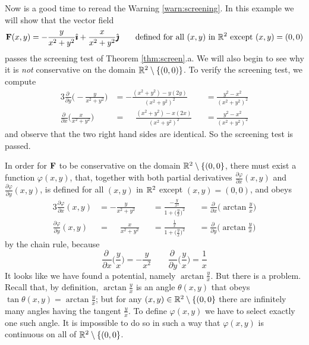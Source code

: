 \begin{eg}\label{eg:screeningCounterexample}
Now is a good time to reread the Warning \ref{warn:screening}.
In this example we will show that the vector field
\begin{equation*}
\mathbf{F}(x,y) = -\frac{y}{x^2+y^2}\hat{\pmb{\imath}} + \frac{x}{x^2+y^2}\hat{\pmb{\jmath}}
\qquad \text{defined for all $(x,y)$ in $\mathbb{R}^2$ except $(x,y)=(0,0)$}
\end{equation*}
passes the screening test of Theorem \ref{thm:screen}.a. We will also
begin to see why it is \emph{not} conservative on the domain
$\mathbb{R}^2\setminus\{(0,0)\}$. To verify the screening test, we compute
\begin{alignat*}{3}
\frac{\partial\ }{\partial y}\Big(-\frac{y}{x^2+y^2}\Big)
  &= -\frac{(x^2+y^2) - y(2y)}{{(x^2+y^2)}^2} 
  &&= \frac{y^2-x^2}{{(x^2+y^2)}^2} \\
\frac{\partial\ }{\partial x}\Big(\frac{x}{x^2+y^2}\Big)
  &=\phantom{-} \frac{(x^2+y^2) - x(2x)}{{(x^2+y^2)}^2} 
  &&= \frac{y^2-x^2}{{(x^2+y^2)}^2}
\end{alignat*}
and observe that the two right hand sides are identical. So the
screening test is passed.

In order for $\mathbf{F}$ to be conservative on the domain
$\mathbb{R}^2\setminus\{(0,0\}$, there must exist a function
$\varphi(x,y)$, that, together with both partial derivatives 
$\frac{\partial \varphi}{\partial x}(x,y)$ and 
$\frac{\partial \varphi}{\partial y}(x,y)$, is defined for all $(x,y)$ 
in $\mathbb{R}^2$ except $(x,y)=(0,0)$, and obeys
\begin{alignat*}{3}
\frac{\partial \varphi}{\partial x}(x,y) &= -\frac{y}{x^2+y^2}
&&= \frac{-\frac{y}{x^2}}{1+\big(\frac{y}{x}\big)^2}
&&=\frac{\partial\ }{\partial x}\Big(\arctan\frac{y}{x}\Big) \\
\frac{\partial \varphi}{\partial y}(x,y) &= \phantom{-} \frac{x}{x^2+y^2} 
&&= \frac{\frac{1}{x}}{1+\big(\frac{y}{x}\big)^2}
&&=\frac{\partial\ }{\partial y}\Big(\arctan\frac{y}{x}\Big)
\end{alignat*}
by the chain rule, because
\begin{equation*}
\frac{\partial\ }{\partial x}\Big(\frac{y}{x}\Big) =-\frac{y}{x^2}
\qquad
\frac{\partial\ }{\partial y}\Big(\frac{y}{x}\Big)=\frac{1}{x}
\end{equation*}
It looks like we have found a potential, namely $\arctan\frac{y}{x}$.
But there is a problem. Recall that, by definition, $\arctan\frac{y}{x}$ is 
an angle $\theta(x,y)$ that obeys
$\tan\theta(x,y)= \arctan\frac{y}{x}$; but for any 
$(x,y)\in\mathbb{R}^2\setminus\{(0,0\}$ there are infinitely many angles 
having the tangent $\frac{y}{x}$. To define $\varphi(x,y)$ we have to 
select exactly one such angle. It is impossible to do so in such a way 
that $\varphi(x,y)$ is continuous on all of $\mathbb{R}^2\setminus\{(0,0\}$.


\end{eg}
